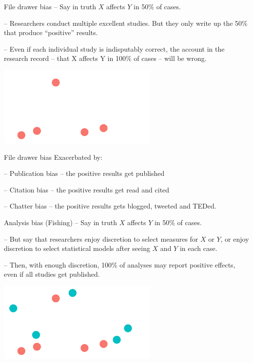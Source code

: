 \documentclass[
  11pt,
  ignorenonframetext,
]{beamer}
\begin{document}
\begin{frame}{File drawer bias}
\protect\hypertarget{file-drawer-bias-1}{}
-- Say in truth \(X\) affects \(Y\) in 50\% of cases.

-- Researchers conduct multiple excellent studies. But they only write
up the 50\% that produce ``positive'' results.

-- Even if each individual study is indisputably correct, the account in
the research record -- that X affects Y in 100\% of cases -- will be
wrong.

\includegraphics{0_lectures_files/figure-beamer/unnamed-chunk-534-1.pdf}
\end{frame}

\begin{frame}{File drawer bias}
\protect\hypertarget{file-drawer-bias-2}{}
Exacerbated by:

-- Publication bias -- the positive results get published

-- Citation bias -- the positive results get read and cited

-- Chatter bias -- the positive results gets blogged, tweeted and TEDed.
\end{frame}

\begin{frame}{Analysis bias (Fishing)}
\protect\hypertarget{analysis-bias-fishing}{}
-- Say in truth \(X\) affects \(Y\) in 50\% of cases.

-- But say that researchers enjoy discretion to select measures for
\(X\) or \(Y\), or enjoy discretion to select statistical models after
seeing \(X\) and \(Y\) in each case.

-- Then, with enough discretion, 100\% of analyses may report positive
effects, even if all studies get published.

\includegraphics{0_lectures_files/figure-beamer/unnamed-chunk-535-1.pdf}
\end{frame}
\end{document}
